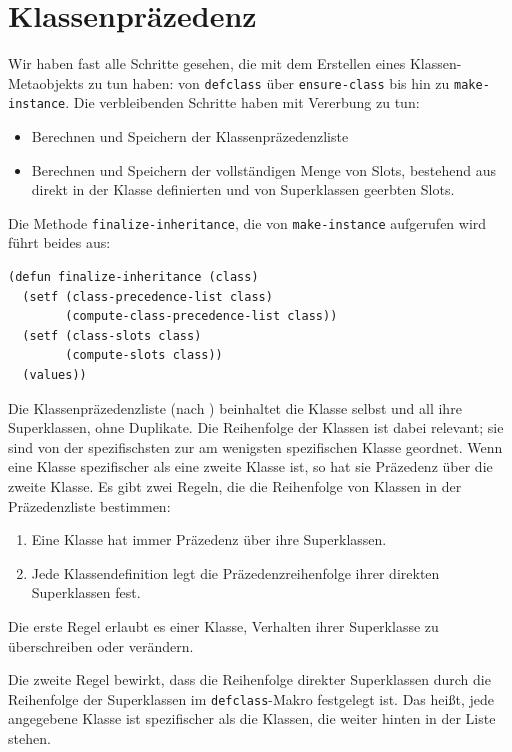 \section{Klassenpräzedenz}
Wir haben fast alle Schritte gesehen, die mit dem Erstellen eines Klassen-Metaobjekts zu tun haben: von \texttt{defclass} über \texttt{ensure-class} bis hin zu \texttt{make-instance}. Die verbleibenden Schritte haben mit Vererbung zu tun:
\begin{itemize}
 \item Berechnen und Speichern der Klassenpräzedenzliste
 \item Berechnen und Speichern der vollständigen Menge von Slots, bestehend aus direkt in der Klasse definierten und von Superklassen geerbten Slots.
\end{itemize}

Die Methode \texttt{finalize-inheritance}, die von \texttt{make-instance} aufgerufen wird führt beides aus:

\begin{lstlisting}
(defun finalize-inheritance (class)
  (setf (class-precedence-list class)
        (compute-class-precedence-list class))
  (setf (class-slots class)
        (compute-slots class))
  (values))
\end{lstlisting}

Die Klassenpräzedenzliste (nach \cite[S. 118ff]{keene}) beinhaltet die Klasse selbst und all ihre Superklassen, ohne Duplikate. Die Reihenfolge der Klassen ist dabei relevant; sie sind von der spezifischsten zur am wenigsten spezifischen Klasse geordnet. Wenn eine Klasse spezifischer als eine zweite Klasse ist, so hat sie Präzedenz über die zweite Klasse. Es gibt zwei Regeln, die die Reihenfolge von Klassen in der Präzedenzliste bestimmen:

\begin{enumerate}
 \item Eine Klasse hat immer Präzedenz über ihre Superklassen.
 \item Jede Klassendefinition legt die Präzedenzreihenfolge ihrer direkten Superklassen fest.
\end{enumerate}

Die erste Regel erlaubt es einer Klasse, Verhalten ihrer Superklasse zu überschreiben oder verändern.

Die zweite Regel bewirkt, dass die Reihenfolge direkter Superklassen durch die Reihenfolge der Superklassen im \texttt{defclass}-Makro festgelegt ist. Das heißt, jede angegebene Klasse ist spezifischer als die Klassen, die weiter hinten in der Liste stehen.

